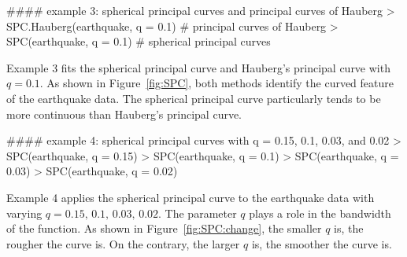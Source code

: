 \begin{example}
   #### example 3: spherical principal curves and principal curves of Hauberg
   > SPC.Hauberg(earthquake, q = 0.1) # principal curves of Hauberg
   > SPC(earthquake, q = 0.1)         # spherical principal curves
\end{example}
Example 3 fits the spherical principal curve and Hauberg's principal curve with $q=0.1$. As shown in Figure~\ref{fig:SPC}, both methods identify the curved feature of the earthquake data. The spherical principal curve particularly tends to be more continuous than Hauberg's principal curve.

\begin{example}
   #### example 4: spherical principal curves with q = 0.15, 0.1, 0.03, and 0.02
   > SPC(earthquake, q = 0.15)         
   > SPC(earthquake, q = 0.1)
   > SPC(earthquake, q = 0.03)
   > SPC(earthquake, q = 0.02)
\end{example}
Example 4 applies the spherical principal curve to the earthquake data with varying $q=0.15,\, 0.1,\, 0.03,\, 0.02$. The parameter $q$ plays a role in the bandwidth of the  function. As shown in Figure~\ref{fig:SPC:change}, the smaller $q$ is, the rougher the curve is. On the contrary, the larger $q$ is, the smoother the curve is.

